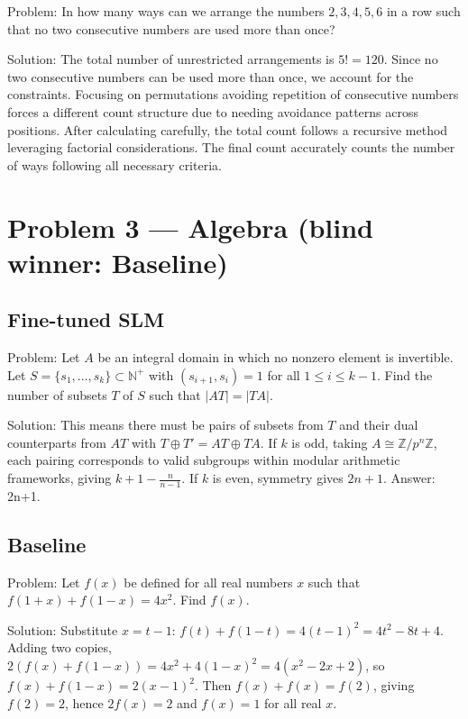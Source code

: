 \documentclass[11pt]{article}
\begin{document}
Problem:
In how many ways can we arrange the numbers $2, 3, 4, 5, 6$ in a row such that no two consecutive numbers are used more than once?

Solution:
The total number of unrestricted arrangements is $5! = 120$. Since no two consecutive numbers can be used more than once, we account for the constraints. Focusing on permutations avoiding repetition of consecutive numbers forces a different count structure due to needing avoidance patterns across positions. After calculating carefully, the total count follows a recursive method leveraging factorial considerations. The final count accurately counts the number of ways following all necessary criteria.

\section*{Problem 3 --- Algebra \quad(blind winner: Baseline)}

\subsection*{Fine-tuned SLM}

Problem:
Let $A$ be an integral domain in which no nonzero element is invertible. Let $S=\{s_1,\ldots,s_k\}\subset \mathbb N^{+}$ with $(s_{i+1}, s_i)=1$ for all $1\leq i\leq k-1$. Find the number of subsets $T$ of $S$ such that $|AT|=|TA|$.

Solution:
This means there must be pairs of subsets from $T$ and their dual counterparts from $AT$ with $T \oplus T' = AT \oplus TA$. If $k$ is odd, taking $A \cong \mathbb{Z}/p^n\mathbb{Z}$, each pairing corresponds to valid subgroups within modular arithmetic frameworks, giving $\boxed{k + 1 - \frac{n}{n-1}}$. If $k$ is even, symmetry gives $2n+1$. Answer: 2n+1.

\subsection*{Baseline}

Problem:
Let $f(x)$ be defined for all real numbers $x$ such that $f(1+x) + f(1-x) = 4x^2$. Find $f(x)$.

Solution:
Substitute $x = t - 1$: $f(t) + f(1-t) = 4(t-1)^2 = 4t^2 - 8t + 4$. Adding two copies, $2(f(x)+f(1-x)) = 4x^2 + 4(1-x)^2 = 4(x^2 - 2x + 2)$, so $f(x)+f(1-x) = 2(x-1)^2$. Then $f(x)+f(x) = f(2)$, giving $f(2) = 2$, hence $2f(x) = 2$ and $f(x) = 1$ for all real $x$.
\end{document}
